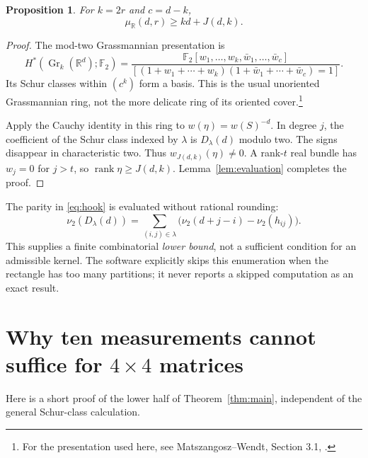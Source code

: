 \documentclass[11pt]{article}
\newtheorem{proposition}[theorem]{Proposition}
\theoremstyle{definition}
\newcommand{\R}{\mathbb R}
\newcommand{\F}{\mathbb F}
\newcommand{\Gr}{\operatorname{Gr}}
\newcommand{\rank}{\operatorname{rank}}
\newcommand{\muR}{\mu_{\R}}
\newcommand{\val}{\nu_2}
\begin{document}
\begin{proposition}\label{prop:sw}
For $k=2r$ and $c=d-k$,
\begin{equation}\label{eq:swbound}
 \muR(d,r)\geq kd+J(d,k).
\end{equation}
\end{proposition}
\begin{proof}
The mod-two Grassmannian presentation is
\[
 H^*(\Gr_k(\R^d);\F_2)=
 \frac{\F_2[w_1,\ldots,w_k,\bar w_1,\ldots,\bar w_c]}
 {[(1+w_1+\cdots+w_k)(1+\bar w_1+\cdots+\bar w_c)=1]}.
\]
Its Schur classes within $(c^k)$ form a basis. This is the usual unoriented Grassmannian ring, not the more delicate ring of its oriented cover.\footnote{For the presentation used here, see Matszangosz--Wendt, Section 3.1, \cite{mw}.}

Apply the Cauchy identity in this ring to $w(\eta)=w(S)^{-d}$. In degree $j$, the coefficient of the Schur class indexed by $\lambda$ is $D_\lambda(d)$ modulo two. The signs disappear in characteristic two. Thus $w_{J(d,k)}(\eta)\neq0$. A rank-$t$ real bundle has $w_j=0$ for $j>t$, so $\rank\eta\geq J(d,k)$. Lemma~\ref{lem:evaluation} completes the proof.
\end{proof}

The parity in \eqref{eq:hook} is evaluated without rational rounding:
\[
 \val(D_\lambda(d))=\sum_{(i,j)\in\lambda}
 \big(\val(d+j-i)-\val(h_{ij})\big).
\]
This supplies a finite combinatorial \emph{lower bound}, not a sufficient condition for an admissible kernel. The software explicitly skips this enumeration when the rectangle has too many partitions; it never reports a skipped computation as an exact result.

\section{Why ten measurements cannot suffice for \texorpdfstring{$4\times4$}{4 x 4} matrices}\label{sec:four}
Here is a short proof of the lower half of Theorem~\ref{thm:main}, independent of the general Schur-class calculation.
\end{document}
